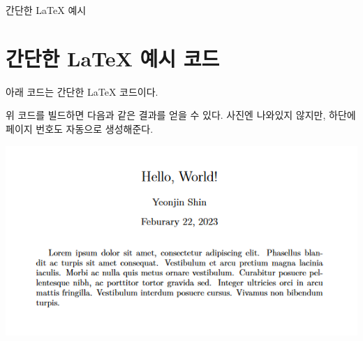 \documentclass{beamer}
\begin{document}
\begin{frame}[allowframebreaks]{간단한 \LaTeX{} 예시}
    \section{간단한 \LaTeX{} 예시 코드}
    아래 코드는 간단한 \LaTeX{} 코드이다.

    

    \framebreak
    위 코드를 빌드하면 다음과 같은 결과를 얻을 수 있다. 사진엔 나와있지 않지만, 하단에 페이지 번호도 자동으로 생성해준다.
    \begin{center}
        \includegraphics[scale=0.5]{images/simple_english_article.png}
    \end{center}
\end{frame}
\end{document}
